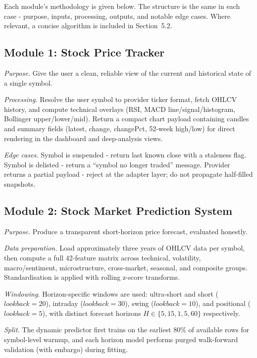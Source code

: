 \documentclass[12pt,a4paper]{report}
\numberwithin{equation}{chapter}
\begin{document}
Each module's methodology is given below. The structure is the same in each case - purpose, inputs, processing, outputs, and notable edge cases. Where relevant, a concise algorithm is included in Section~5.2.

\subsection{Module 1: Stock Price Tracker}

\textit{Purpose.} Give the user a clean, reliable view of the current and historical state of a single symbol.

\textit{Processing.} Resolve the user symbol to provider ticker format, fetch OHLCV history, and compute technical overlays (RSI, MACD line/signal/histogram, Bollinger upper/lower/mid). Return a compact chart payload containing candles and summary fields (latest, change, changePct, 52-week high/low) for direct rendering in the dashboard and deep-analysis views.

\textit{Edge cases.} Symbol is suspended - return last known close with a staleness flag. Symbol is delisted - return a ``symbol no longer traded'' message. Provider returns a partial payload - reject at the adapter layer; do not propagate half-filled snapshots.

\subsection{Module 2: Stock Market Prediction System}

\textit{Purpose.} Produce a transparent short-horizon price forecast, evaluated honestly.

\textit{Data preparation.} Load approximately three years of OHLCV data per symbol, then compute a full 42-feature matrix across technical, volatility, macro/sentiment, microstructure, cross-market, seasonal, and composite groups. Standardisation is applied with rolling z-score transforms.

\textit{Windowing.} Horizon-specific windows are used: ultra-short and short ($lookback=20$), intraday ($lookback=30$), swing ($lookback=10$), and positional ($lookback=5$), with distinct forecast horizons $H \in \{5,15,1,5,60\}$ respectively.

\textit{Split.} The dynamic predictor first trains on the earliest 80\% of available rows for symbol-level warmup, and each horizon model performs purged walk-forward validation (with embargo) during fitting.
\end{document}
